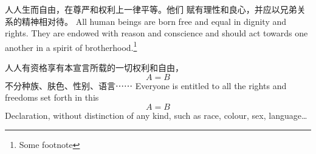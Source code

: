 \documentclass{article}
\newenvironment{english} %
{\addvspace\medskipamount} %
{\par\addvspace\medskipamount}
\begin{document}
\setlength\parindent{2cm}
人人生而自由，在尊严和权利上一律平等。他们
赋有理性和良心，并应以兄弟关系的精神相对待。
\begin{english}
All human beings are born free and equal in
dignity and rights. They are endowed with
reason and conscience and should act towards
one another in a spirit of brotherhood.\footnote{Some footnote}
\end{english}
人人有资格享有本宣言所载的一切权利和自由，
\begin{equation}
A=B
\end{equation}
不分种族、肤色、性别、语言⋯⋯
\begin{english}
Everyone is entitled to all the rights and
freedoms set forth in this
\begin{equation}
A=B
\end{equation}
Declaration,
without distinction of any kind, such as
race, colour, sex, language\dots
\end{english}
\end{document}
